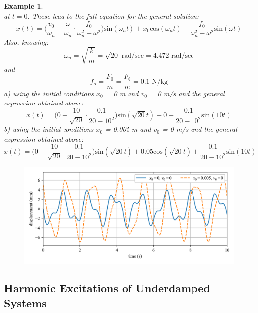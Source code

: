 \documentclass[12pt,letter]{article}
\newtheorem{ex}{Example}
\numberwithin{ex}{section} %
\newenvironment{example}{\begin{mdframed}[middlelinewidth=0.5mm]\begin{ex}\normalfont}{\end{ex}\end{mdframed}}
\numberwithin{re}{section} %
\begin{document}
\begin{example}
\begin{equation}
			\end{equation}	
			at $t=0$. These lead to the full equation for the general solution:
			\begin{equation}
				x(t) = \Big(\frac{v_0}{\omega_n}-\frac{\omega}{\omega_n}\cdot \frac{f_0}{\omega_n^2-\omega^2}\Big)\text{sin}(\omega_n t) + x_0\text{cos}(\omega_n t) + \frac{f_0}{\omega_n^2-\omega^2}\text{sin}(\omega t)
			\end{equation}								
			Also, knowing:
			\begin{equation}
				\omega_n = \sqrt{\frac{k}{m}} = \sqrt{20} \text{ rad/sec} =  4.472 \text{ rad/sec}
			\end{equation}				
			and
			\begin{equation}
				f_o = \frac{F_0}{m} = \frac{F_0}{m} = 0.1 \text{ N/kg}
			\end{equation}	
			a) using the initial conditions $x_0$ = 0 m and $v_0$ = 0 m/s and the general expression obtained above:
			\begin{equation}
				x(t) = \Big(0-\frac{10}{\sqrt{20}}\cdot \frac{0.1}{20-10^2}\Big)\text{sin}(\sqrt{20} t) + 0 + \frac{0.1}{20-10^2}\text{sin}(10 t)
			\end{equation}			
			b) using the initial conditions $x_0$ = 0.005 m and $v_0$ = 0 m/s and the general expression obtained above:
			\begin{equation}
				x(t) = \Big(0-\frac{10}{\sqrt{20}}\cdot \frac{0.1}{20-10^2}\Big)\text{sin}(\sqrt{20} t) + 0.05\text{cos}(\sqrt{20} t) + \frac{0.1}{20-10^2}\text{sin}(10 t)
			\end{equation}			
			\begin{figure}[H]
				\centering
				\includegraphics[width=1.0\textwidth]{../Figures/response_1-DOF-spring_mass_forced.png}
			\end{figure}
\end{example}


	
		\subsection{Harmonic Excitations of Underdamped Systems}
\end{document}
